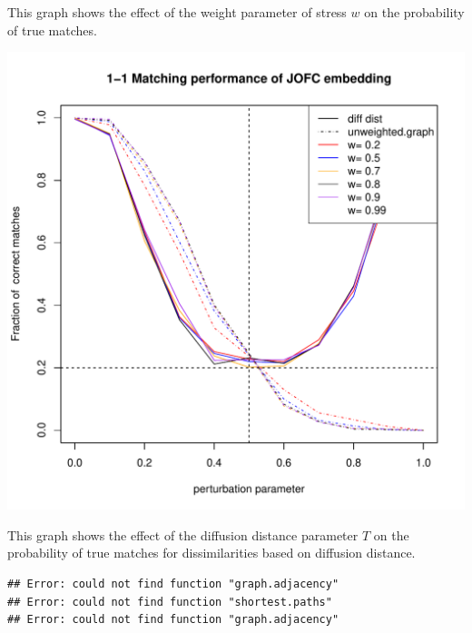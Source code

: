 \documentclass[11pt]{article} %
\begin{document}
This graph shows the effect of the weight parameter of stress $w$ on the probability of true matches.

\begin{knitrout}
\color{fgcolor}\includegraphics{graphs/FidCommPapergraph-plot-4} 
\end{knitrout}



This graph shows the effect of the diffusion distance parameter $T$ on the probability of true matches for dissimilarities based on diffusion distance.


\begin{knitrout}
\color{fgcolor}\begin{kframe}
\begin{verbatim}
## Error: could not find function "graph.adjacency"
## Error: could not find function "shortest.paths"
## Error: could not find function "graph.adjacency"
\end{verbatim}
\end{kframe}
\end{knitrout}
\end{document}

